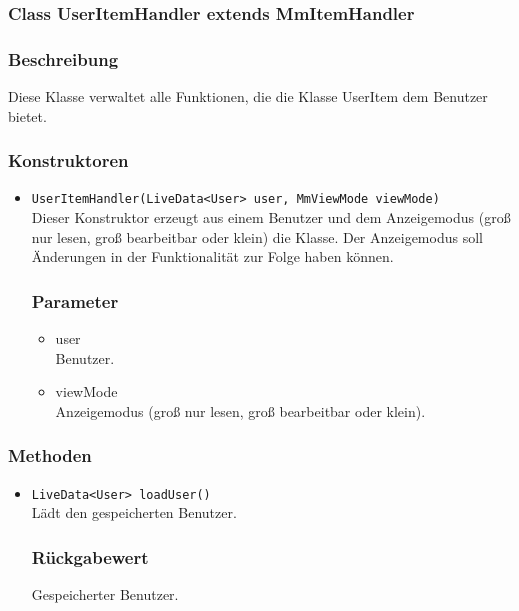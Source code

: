 \documentclass[a4paper]{scrreprt}
\begin{document}

\subsubsection{Class UserItemHandler extends MmItemHandler}
\subsubsection*{Beschreibung}
Diese Klasse verwaltet alle Funktionen, die die Klasse UserItem dem Benutzer bietet.

\subsubsection*{Konstruktoren}
\begin{addmargin}[25pt]{0pt}
\begin{itemize}

\item \texttt{UserItemHandler(LiveData<User> user, MmViewMode viewMode)}\\
	Dieser Konstruktor erzeugt aus einem Benutzer und dem Anzeigemodus (groß nur lesen, groß bearbeitbar oder klein) die Klasse. Der Anzeigemodus soll Änderungen in der Funktionalität zur Folge haben können.

	\subsubsection*{Parameter}
	\begin{itemize}
	\item user \\
		Benutzer.
	\item viewMode \\
		Anzeigemodus (groß nur lesen, groß bearbeitbar oder klein).
	\end{itemize}

\end{itemize}
\end{addmargin}

\subsubsection*{Methoden}
\begin{addmargin}[25pt]{0pt}
\begin{itemize}

\item \texttt{LiveData<User> loadUser()}\\
	Lädt den gespeicherten Benutzer.

  \subsubsection*{Rückgabewert}
	Gespeicherter Benutzer.

\end{itemize}
\end{addmargin}
\end{document}
